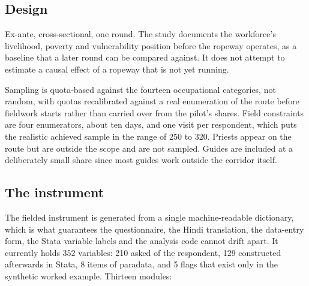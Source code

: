 \documentclass[11pt]{article}
\begin{document}
\subsection{Design}

Ex-ante, cross-sectional, one round. The study documents the workforce's livelihood, poverty
and vulnerability position before the ropeway operates, as a baseline that a later round can be
compared against. It does not attempt to estimate a causal effect of a ropeway that is not yet
running.

Sampling is quota-based against the fourteen occupational categories, not random, with quotas
recalibrated against a real enumeration of the route before fieldwork starts rather than
carried over from the pilot's shares. Field constraints are four enumerators, about ten days,
and one visit per respondent, which puts the realistic achieved sample in the range of 250 to
320. Priests appear on the route but are outside the scope and are not sampled. Guides are
included at a deliberately small share since most guides work outside the corridor itself.

\subsection{The instrument}

The fielded instrument is generated from a single machine-readable dictionary, which is what
guarantees the questionnaire, the Hindi translation, the data-entry form, the Stata variable
labels and the analysis code cannot drift apart. It currently holds 352 variables: 210 asked
of the respondent, 129 constructed afterwards in Stata, 8 items of paradata, and 5 flags that
exist only in the synthetic worked example. Thirteen modules:
\end{document}

